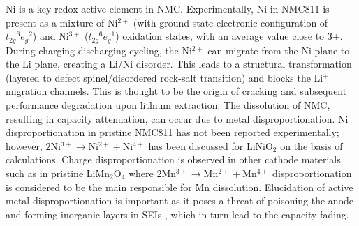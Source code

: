 \documentclass[aps,prb,twocolumn,superscriptaddress,reprint]{revtex4-1}
\begin{document}
Ni is a key redox active element in NMC. Experimentally, Ni in NMC811 is present as a mixture of Ni$^{2+}$ (with ground-state electronic configuration of ${t_{2g}}^{6}{e_{g}}^{2}$) and Ni$^{3+}$ (${t_{2g}}^{6}{e_{g}}^{1}$) oxidation states, with an average value close to 3+. \cite{Zhu_JMatChemA2019,Katharina-chemmater,Kondrakov_JPhysChemC2017} 
During charging-discharging cycling, the Ni$^{2+}$  can migrate from the Ni plane to the Li plane, creating a Li/Ni disorder.\cite{Zhang-acs.chemmater-2019, Feng-2019, Xia2018} 
This leads to a structural transformation (layered to defect spinel/disordered rock-salt transition) and blocks the Li$^{+}$  migration channels.\cite{Xia2018} 
This is thought to be the origin of cracking and subsequent performance degradation upon lithium extraction.\cite{Katharina-chemmater,Li-aenm-2019,Li-EER-2020}   
The dissolution of NMC, resulting in capacity attenuation, can occur due to metal disproportionation.\cite{buchberger2015} 
Ni disproportionation in pristine NMC811 has not been reported experimentally; however, $2$Ni$^{3+}\rightarrow$Ni$^{2+} + $Ni$^{4+}$ has been discussed for LiNiO$_2$ on the basis of calculations.\cite{HChen_PhysRevB2011} 
Charge disproportionation is observed in other cathode materials such as in pristine LiMn$_2$O$_4$ where  $2$Mn$^{3+}\rightarrow$Mn$^{2+} + $Mn$^{4+}$ disproportionation is considered to be the main responsible for Mn dissolution. 
Elucidation of active metal disproportionation is important as it poses a threat of poisoning the anode \cite{Parmar-LMO-2020,PASQUALINI2017} and forming inorganic layers in SEIs \cite{joshi2014}, which in turn lead to the capacity fading. 
\end{document}
